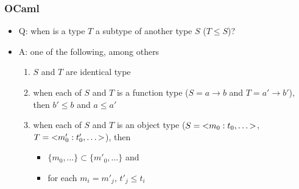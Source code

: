 \documentclass[12pt,dvipdfmx]{beamer}
\begin{document}
\begin{frame}
  \frametitle{OCaml}
  \begin{itemize}
  \item<1-> Q: when is a type $T$ a subtype of another type $S$ ($T \leq S$)?
  \item<2-> A: one of the following, among others
    \begin{enumerate}
    \item<2-> $S$ and $T$ are identical type
    \item<3-> when each of $S$ and $T$ is a function type ($S = a \rightarrow b$
      and $T = a' \rightarrow b'$), then $b' \leq b$ and $a \leq a'$
    \item<4-> when each of $S$ and $T$ is an object type ($S = {\tt <} m_0 : t_0, \ldots {\tt >}$,
      $T = {\tt <} m'_0 : t'_0, \ldots {\tt >}$), then
      \begin{itemize}
      \item $\{ m_0, \ldots \} \subset \{ m'_0, \ldots \}$ and 
      \item for each $m_i = m'_j$, $t'_j \leq t_i$
      \end{itemize}
    \end{enumerate}
  \end{itemize}
\end{frame}
\end{document}
